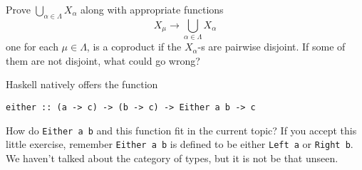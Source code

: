 \begin{exercise}
Prove \(\bigcup_{\alpha \in \Lambda} X_\alpha\) along with appropriate functions
\[X_\mu \to \bigcup_{\alpha \in \Lambda} X_\alpha\]
one for each \(\mu \in \Lambda\), is a coproduct if the \(X_\alpha\)-s are pairwise disjoint. If some of them are not disjoint, what could go wrong?
\end{exercise}

\begin{exercise}
Haskell natively offers the function
\begin{center}
{\tt either :: (a -> c) -> (b -> c) -> Either a b -> c}
\end{center}
How do {\tt Either a b} and this function fit in the current topic? If you accept this little exercise, remember {\tt Either a b} is defined to be either {\tt Left a} or {\tt Right b}. We haven't talked about the category of types, but it is not be that unseen.
\end{exercise}

